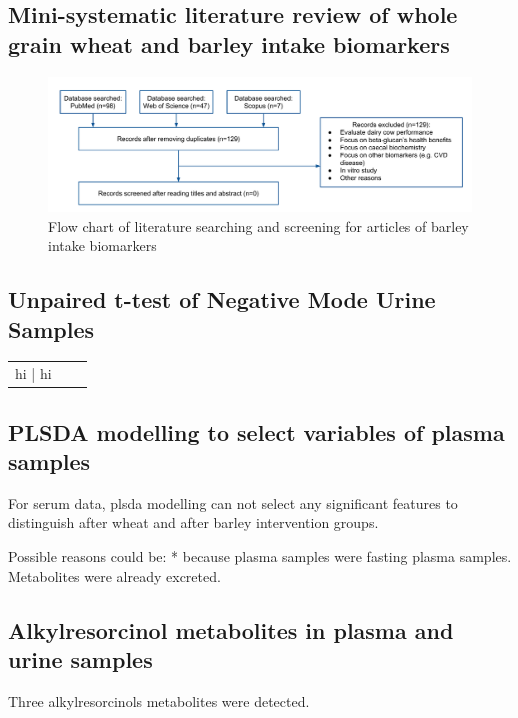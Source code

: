 \subsection{Mini-systematic literature review of whole grain wheat and barley intake biomarkers}
\begin{figure}
	\centering
	\includegraphics[width=\linewidth]{picture/barley_biomarker_review}
	\caption{Flow chart of literature searching and screening for articles of barley intake biomarkers}
	\label{fig:barleybiomarkerreview}
\end{figure}


\subsection{Unpaired t-test of Negative Mode Urine Samples}
\begin{tabular}{c|c|c}
	hi | hi
\end{tabular}

\subsection{PLSDA modelling to select variables of plasma samples}
For serum data, plsda modelling can not select any significant features to distinguish after wheat and after barley intervention groups.

Possible reasons could be:
* because plasma samples were fasting plasma samples. Metabolites were already excreted.

\subsection{Alkylresorcinol metabolites in plasma and urine samples}
Three alkylresorcinols metabolites were detected. 